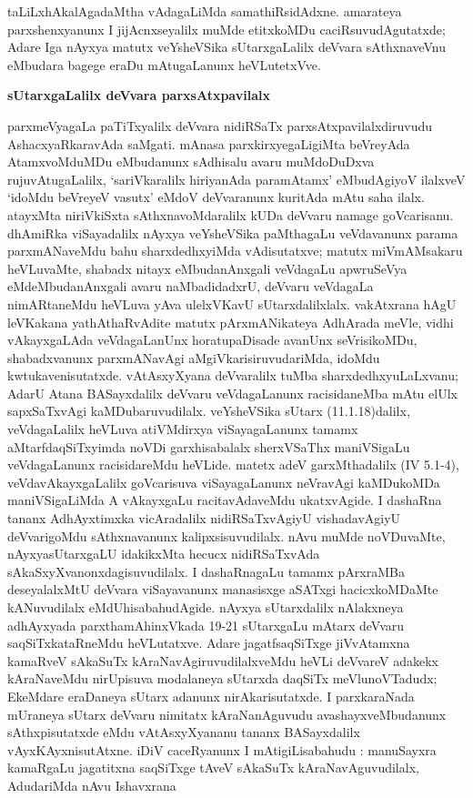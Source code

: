 taLiLxhAkalAgadaMtha vAdagaLiMda samathiRsidAdxne. amarateya parxshenxyanunx I jijAcnxseyalilx muMde etitxkoMDu caciRsuvudAgutatxde; Adare Iga nAyxya matutx veYsheVSika sUtarxgaLalilx deVvara sAthxnaveVnu eMbudara bagege eraDu mAtugaLanunx heVLutetxVve.

\bigskip
\begin{center}
{\Large\bf sUtarxgaLalilx deVvara parxsAtxpavilalx}
\end{center}

parxmeVyagaLa paTiTxyalilx deVvara nidiRSaTx parxsAtxpavilalxdiruvudu AshacxyaRkaravAda saMgati. mAnasa parxkirxyegaLigiMta beVreyAda AtamxvoMduMDu eMbudanunx sAdhisalu avaru muMdoDuDxva rujuvAtugaLalilx, `sariVkaralilx hiriyanAda paramAtamx' eMbudAgiyoV ilalxveV `idoMdu beVreyeV vasutx' eMdoV deVvaranunx kuritAda mAtu saha ilalx. atayxMta niriVkiSxta sAthxnavoMdaralilx kUDa deVvaru namage goVcarisanu. dhAmiRka viSayadalilx nAyxya veYsheVSika paMthagaLu veVdavanunx parama parxmANaveMdu bahu sharxdedhxyiMda vAdisutatxve; matutx miVmAMsakaru heVLuvaMte, shabadx nitayx eMbudanAnxgali veVdagaLu apwruSeVya eMdeMbudanAnxgali avaru naMbadidadxrU, deVvaru veVdagaLa nimARtaneMdu heVLuva yAva ulelxVKavU sUtarxdalilxlalx. vakAtxrana hAgU leVKakana yathAthaRvAdite matutx pArxmANikateya AdhArada meVle, vidhi vAkayxgaLAda veVdagaLanUnx horatupaDisade avanUnx seVrisikoMDu, shabadxvanunx parxmANavAgi aMgiVkarisiruvudariMda, idoMdu kwtukavenisutatxde. vAtAsxyXyana deVvaralilx tuMba sharxdedhxyuLaLxvanu; AdarU Atana BASayxdalilx deVvaru veVdagaLanunx racisidaneMba mAtu elUlx sapxSaTxvAgi kaMDubaruvudilalx. veYsheVSika sUtarx {\rm(11.1.18)}dalilx, veVdagaLalilx heVLuva atiVMdirxya viSayagaLanunx tamamx aMtarfdaqSiTxyimda noVDi garxhisabalalx sherxVSaThx maniVSigaLu veVdagaLanunx racisidareMdu heVLide. matetx adeV garxMthadalilx {\rm(IV 5.1-4)}, veVdavAkayxgaLalilx goVcarisuva viSayagaLanunx neVravAgi kaMDukoMDa maniVSigaLiMda A vAkayxgaLu racitavAdaveMdu ukatxvAgide. I dashaRna tananx AdhAyxtimxka vicAradalilx nidiRSaTxvAgiyU vishadavAgiyU deVvarigoMdu sAthxnavanunx kalipxsisuvudilalx. nAvu muMde noVDuvaMte, nAyxyasUtarxgaLU idakikxMta hecucx nidiRSaTxvAda sAkaSxyXvanonxdagisuvudilalx. I dashaRnagaLu tamamx pArxraMBa deseyalalxMtU deVvara viSayavanunx manasisxge aSATxgi hacicxkoMDaMte kANuvudilalx eMdUhisabahudAgide. nAyxya sUtarxdalilx nAlakxneya adhAyxyada parxthamAhinxVkada {\rm 19-21} sUtarxgaLu mAtarx deVvaru saqSiTxkataRneMdu heVLutatxve. Adare jagatfsaqSiTxge jiVvAtamxna kamaRveV sAkaSuTx kAraNavAgiruvudilalxveMdu heVLi deVvareV adakekx kAraNaveMdu nirUpisuva modalaneya sUtarxda daqSiTx meVlunoVTadudx; EkeMdare eraDaneya sUtarx adanunx nirAkarisutatxde. I parxkaraNada mUraneya sUtarx deVvaru nimitatx kAraNanAguvudu avashayxveMbudanunx sAthxpisutatxde eMdu vAtAsxyXyananu tananx BASayxdalilx vAyxKAyxnisutAtxne. iDiV caceRyanunx I mAtigiLisabahudu : manuSayxra kamaRgaLu jagatitxna saqSiTxge tAveV sAkaSuTx kAraNavAguvudilalx, AdudariMda nAvu Ishavxrana 